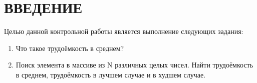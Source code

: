 \chapter*{\hfill{\centering ВВЕДЕНИЕ}\hfill}

Целью данной контрольной работы является выполнение следующих задания:
\begin{enumerate}
	\item Что такое трудоёмкость в среднем?
	\item Поиск элемента в массиве из N различных целых чисел. Найти трудоёмкость в среднем, трудоёмкость в лучшем случае и в худшем случае.
\end{enumerate}

